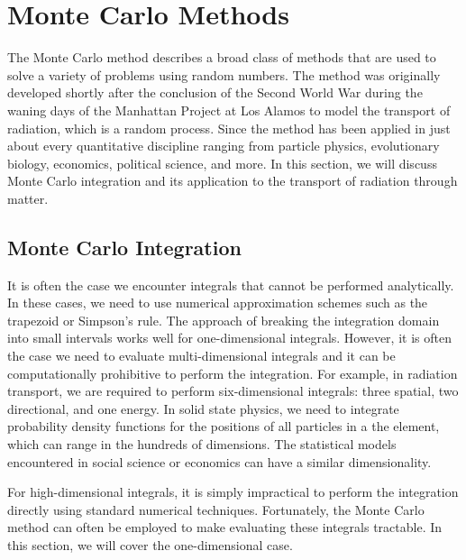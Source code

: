 \section{Monte Carlo Methods}

The Monte Carlo method describes a broad class of methods that are used to solve a variety of problems using random numbers. The method was originally developed shortly after the conclusion of the Second World War during the waning days of the Manhattan Project at Los Alamos to model the transport of radiation, which is a random process. Since the method has been applied in just about every quantitative discipline ranging from particle physics, evolutionary biology, economics, political science, and more. In this section, we will discuss Monte Carlo integration and its application to the transport of radiation through matter.

\subsection{Monte Carlo Integration}

It is often the case we encounter integrals that cannot be performed analytically. In these cases, we need to use numerical approximation schemes such as the trapezoid or Simpson's rule. The approach of breaking the integration domain into small intervals works well for one-dimensional integrals. However, it is often the case we need to evaluate multi-dimensional integrals and it can be computationally prohibitive to perform the integration. For example, in radiation transport, we are required to perform six-dimensional integrals: three spatial, two directional, and one energy. In solid state physics, we need to integrate probability density functions for the positions of all particles in a the element, which can range in the hundreds of dimensions. The statistical models encountered in social science or economics can have a similar dimensionality.

For high-dimensional integrals, it is simply impractical to perform the integration directly using standard numerical techniques. Fortunately, the Monte Carlo method can often be employed to make evaluating these integrals tractable. In this section, we will cover the one-dimensional case.


